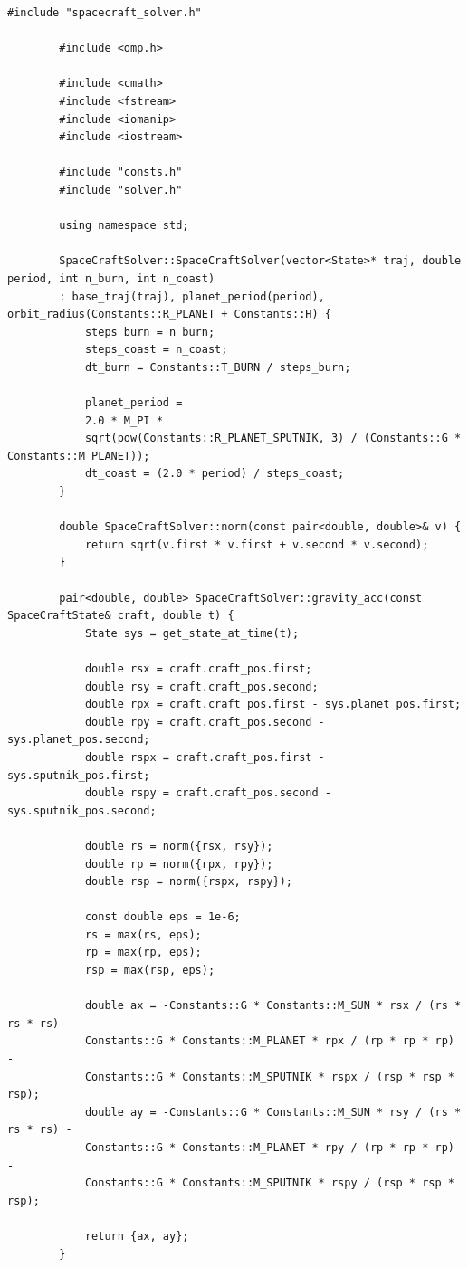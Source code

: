 \documentclass[14pt,a4paper]{extarticle}
\theoremstyle{plain}
\begin{document}
	\begin{lstlisting}[title=spacecraftSolver.cpp, gobble=16, breaklines=true, breakatwhitespace=true]
		#include "spacecraft_solver.h"
		
		#include <omp.h>
		
		#include <cmath>
		#include <fstream>
		#include <iomanip>
		#include <iostream>
		
		#include "consts.h"
		#include "solver.h"
		
		using namespace std;
		
		SpaceCraftSolver::SpaceCraftSolver(vector<State>* traj, double period, int n_burn, int n_coast)
		: base_traj(traj), planet_period(period), orbit_radius(Constants::R_PLANET + Constants::H) {
			steps_burn = n_burn;
			steps_coast = n_coast;
			dt_burn = Constants::T_BURN / steps_burn;
			
			planet_period =
			2.0 * M_PI *
			sqrt(pow(Constants::R_PLANET_SPUTNIK, 3) / (Constants::G * Constants::M_PLANET));
			dt_coast = (2.0 * period) / steps_coast;
		}
		
		double SpaceCraftSolver::norm(const pair<double, double>& v) {
			return sqrt(v.first * v.first + v.second * v.second);
		}
		
		pair<double, double> SpaceCraftSolver::gravity_acc(const SpaceCraftState& craft, double t) {
			State sys = get_state_at_time(t);
			
			double rsx = craft.craft_pos.first;
			double rsy = craft.craft_pos.second;
			double rpx = craft.craft_pos.first - sys.planet_pos.first;
			double rpy = craft.craft_pos.second - sys.planet_pos.second;
			double rspx = craft.craft_pos.first - sys.sputnik_pos.first;
			double rspy = craft.craft_pos.second - sys.sputnik_pos.second;
			
			double rs = norm({rsx, rsy});
			double rp = norm({rpx, rpy});
			double rsp = norm({rspx, rspy});
			
			const double eps = 1e-6;
			rs = max(rs, eps);
			rp = max(rp, eps);
			rsp = max(rsp, eps);
			
			double ax = -Constants::G * Constants::M_SUN * rsx / (rs * rs * rs) -
			Constants::G * Constants::M_PLANET * rpx / (rp * rp * rp) -
			Constants::G * Constants::M_SPUTNIK * rspx / (rsp * rsp * rsp);
			double ay = -Constants::G * Constants::M_SUN * rsy / (rs * rs * rs) -
			Constants::G * Constants::M_PLANET * rpy / (rp * rp * rp) -
			Constants::G * Constants::M_SPUTNIK * rspy / (rsp * rsp * rsp);
			
			return {ax, ay};
		}
		

\end{lstlisting}
\end{document}
